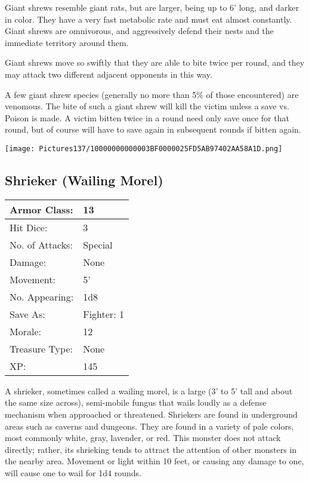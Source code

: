 \documentclass[a4paper,twoside,openany,10pt]{book}
\begin{document}
\begin{multicols}{2}
Giant shrews resemble giant rats, but are larger, being up to 6' long, and darker in color. They have a very fast metabolic rate and must eat almost constantly. Giant shrews are omnivorous, and aggressively defend their nests and the immediate territory around them.

Giant shrews move so swiftly that they are able to bite twice per round, and they may attack two different adjacent opponents in this way.

A few giant shrew species (generally no more than 5\% of those encountered) are venomous. The bite of such a giant shrew will kill the victim unless a save vs. Poison is made. A victim bitten twice in a round need only save once for that round, but of course will have to save again in subsequent rounds if bitten again.

\begin{center} \texttt{[image: Pictures137/10000000000003BF0000025FD5AB97402AA58A1D.png]} \end{center}


\subsection*{Shrieker (Wailing Morel)}\label{shrieker-wailing-morel}

\begin{tabularx}{0.50\textwidth}{@{}lX@{}}
Armor Class: & 13 \\\hline
Hit Dice: & 3 \\\hline
No. of Attacks: & Special \\\hline
Damage: & None \\\hline
Movement: & 5' \\\hline
No. Appearing: & 1d8 \\\hline
Save As: & Fighter: 1 \\\hline
Morale: & 12 \\\hline
Treasure Type: & None \\\hline
XP: & 145 \\\hline
\end{tabularx}\medskip

A shrieker, sometimes called a wailing morel,\textbf{ }is a large (3' to 5' tall and about the same size across), semi-mobile fungus that wails loudly as a defense mechanism when approached or threatened. Shriekers are found in underground areas such as caverns and dungeons. They are found in a variety of pale colors, most commonly white, gray, lavender, or red.  This monster does not attack directly; rather, its shrieking tends to attract the attention of other monsters in the nearby area. Movement or light within 10 feet, or causing any damage to one, will cause one to wail for 1d4 rounds.


\end{multicols}
\end{document}
